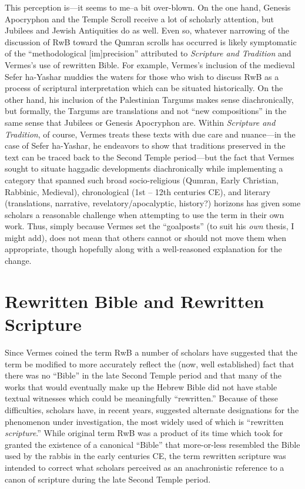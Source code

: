This perception is---it seems to me--a bit over-blown. On the one hand,
Genesis Apocryphon and the Temple Scroll receive a lot of scholarly
attention, but Jubilees and Jewish Antiquities do as well. Even so,
whatever narrowing of the discussion of RwB toward the Qumran scrolls
has occurred is likely symptomatic of the ``methodological
{[}im{]}precision'' attributed to \emph{Scripture and Tradition} and
Vermes's use of rewritten Bible. For example, Vermes's inclusion of the
medieval Sefer ha-Yashar muddies the waters for those who wish to
discuss RwB as a process of scriptural interpretation which can be
situated historically. On the other hand, his inclusion of the
Palestinian Targums makes sense diachronically, but formally, the
Targums are translations and not ``new compositions'' in the same sense
that Jubilees or Genesis Apocryphon are. Within
\emph{Scripture and Tradition}, of course, Vermes treats these texts
with due care and nuance---in the case of Sefer ha-Yashar, he endeavors
to show that traditions preserved in the text can be traced back to the
Second Temple period---but the fact that Vermes sought to situate
haggadic developments diachronically while implementing a category that
spanned such broad socio-religious (Qumran, Early Christian, Rabbinic,
Medieval), chronological (1st -- 12th centuries CE), and literary
(translations, narrative, revelatory/apocalyptic, history?) horizons has
given some scholars a reasonable challenge when attempting to use the
term in their own work. Thus, simply because Vermes set the
``goalposts'' (to suit his \emph{own} thesis, I might add), does not
mean that others cannot or should not move them when appropriate, though
hopefully along with a well-reasoned explanation for the change.

\section{Rewritten Bible and Rewritten
Scripture}\label{rwb-and-rewritten-scripture}

Since Vermes coined the term RwB a number of scholars have suggested
that the term be modified to more accurately reflect the (now, well
established) fact that there was no ``Bible'' in the late Second Temple
period and that many of the works that would eventually make up the
Hebrew Bible did not have stable textual witnesses which could be
meaningfully ``rewritten.'' Because of these difficulties, scholars
have, in recent years, suggested alternate designations for the
phenomenon under investigation, the most widely used of which is
``rewritten \emph{scripture}.'' While original term RwB was a product of
its time which took for granted the existence of a canonical ``Bible''
that more-or-less resembled the Bible used by the rabbis in the early
centuries CE, the term rewritten scripture was intended to correct what
scholars perceived as an anachronistic reference to a canon of scripture
during the late Second Temple
period.\autocites[58--59]{campbell_zsengeller2014}[See
also][]{ulrich_mcdonald-sanders2002}[and][]{ulrich_zsengeller2014}

